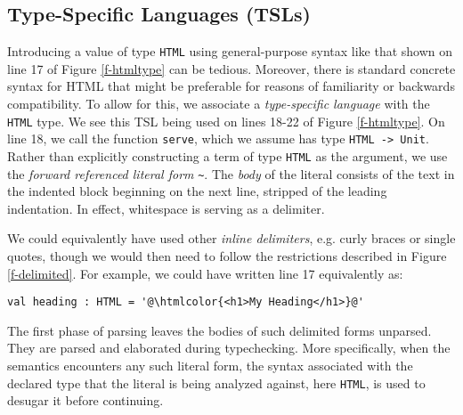 \documentclass{sig-alternate}[10pt]
\newcommand{\htmlcolor}[1]{\textcolor[HTML]{339933}{#1}}
\newcommand{\lstinlinew}[1]{\lstinline[style=wyvern]{#1}}
\begin{document}

\subsection{Type-Specific Languages (TSLs)}



Introducing a value of type \lstinlinew{HTML} using general-purpose syntax like that shown on line 17 of Figure \ref{f-htmltype} can be tedious. Moreover, there is standard concrete syntax for HTML that might be preferable for reasons of familiarity or backwards compatibility. To allow for this, we associate a \emph{type-specific language} with the \lstinlinew{HTML} type. %
We see this TSL being used on lines 18-22 of Figure \ref{f-htmltype}. On line 18, we  call the function \lstinlinew{serve}, which we assume has type \lstinlinew{HTML -> Unit}. Rather than explicitly constructing a term of type \lstinlinew{HTML} as the argument, we use the \emph{forward referenced literal form} \lstinline[style=wyvern]{~}. The \emph{body} of the literal consists of the text in the indented block beginning on the next line, stripped of the leading indentation. In effect, whitespace is serving as a delimiter. 

We could equivalently have used other \emph{inline delimiters}, e.g. curly braces or single quotes, though we would then need to follow the restrictions described in Figure \ref{f-delimited}. For example, we could have written line 17 equivalently as:
\vspace{-3px}\begin{lstlisting}[style=wyvern, numbers=none, frame=none]
  val heading : HTML = '@\htmlcolor{<h1>My Heading</h1>}@'
\end{lstlisting}\vspace{-5px}

The first phase of parsing leaves the bodies of such delimited forms unparsed. They are parsed and elaborated during typechecking. More specifically, when the semantics encounters any such literal form, the syntax associated with the declared type that the literal is being analyzed against, here \lstinlinew{HTML}, is used to desugar it before continuing.
\end{document}
